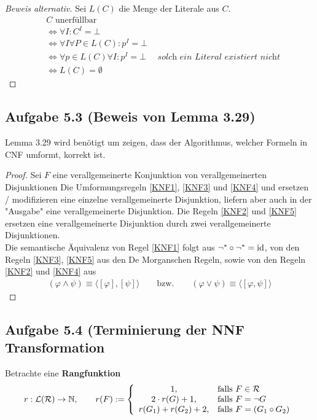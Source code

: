 \begin{proof}[Beweis alternativ]
	Sei $L(C)$ die Menge der Literale aus $C$.
	\begin{align*}
		& C \text{ unerfüllbar}\\
		& \iff \forall I : C^I = \bot\\
		& \iff \forall I \forall P \in L(C): p^I = \bot\\
		& \iff \forall p \in L(C) \forall I : p^I = \bot \quad \textit{ solch ein Literal existiert nicht}\\
		& \iff L(C) = \emptyset
	\end{align*}
\end{proof}

\subsection{Aufgabe 5.3 (Beweis von Lemma 3.29)}
Lemma 3.29 wird benötigt um zeigen, dass der Algorithmus, welcher Formeln in CNF umformt, korrekt ist.

\begin{proof}
	Sei $F$ eine verallgemeinerte Konjunktion von verallgemeinerten Disjunktionen
	Die Umformungsregeln \eqref{KNF1}, \eqref{KNF3} und \eqref{KNF4} und ersetzen / modifizieren eine einzelne verallgemeinerte Disjunktion, liefern aber auch in der "Ausgabe" eine verallgemeinerte Disjunktion. 
	Die Regeln \eqref{KNF2} und \eqref{KNF5} ersetzen eine verallgemeinerte Disjunktion durch zwei verallgemeinerte Disjunktionen.\\
	Die semantische Äquivalenz von Regel \eqref{KNF1} folgt aus $\neg^\ast\circ\neg^\ast=\operatorname{id}$, von den Regeln \eqref{KNF3}, \eqref{KNF5} aus den De Morganschen  Regeln, sowie von den Regeln \eqref{KNF2} und \eqref{KNF4} aus 
	\begin{align*}
		(\varphi\wedge\psi)\equiv\big\langle[\varphi],[\psi]\big\rangle
		\qquad\text{bzw.}\qquad
		(\varphi\vee\psi)\equiv\big\langle[\varphi,\psi]\big\rangle
	\end{align*}
\end{proof}

\subsection{Aufgabe 5.4 (Terminierung der NNF Transformation}
Betrachte eine \textbf{Rangfunktion}
\begin{align*}
	r:\mathcal{L}(\mathcal{R})\to\mathbb{N},\qquad r(F):=\left\lbrace\begin{array}{cl}
		1, &\text{falls } F\in\mathcal{R}\\
		2\cdot r(G)+1, &\text{falls } F=\neg G\\
		r(G_1)+r(G_2)+2, &\text{falls } F=(G_1\circ G_2)
	\end{array}\right.
\end{align*}

